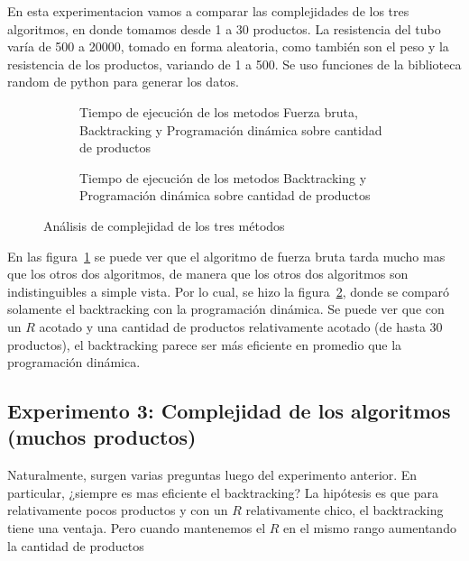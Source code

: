 \documentclass[10pt,a4paper]{article}
\begin{document}
En esta experimentacion vamos a comparar las complejidades de los tres algoritmos, en donde tomamos desde 1 a 30 productos. La resistencia del tubo var\'ia de 500 a 20000, tomado en forma aleatoria, como tambi\'en son el peso y la resistencia de los productos, variando de 1 a 500. Se uso funciones de la biblioteca random de python para generar los datos.

    \begin{figure}[!ht]
        \centering
        \begin{subfigure}{0.45\linewidth}
            \centering
            
            \caption{Tiempo de ejecución de los metodos Fuerza bruta, Backtracking y Programaci\'on din\'amica sobre cantidad de productos}
            \label{fig:comparacion-bt-fb-dp}
        \end{subfigure}
        \begin{subfigure}{0.45\linewidth}
            \centering
            
            \caption{Tiempo de ejecución de los metodos Backtracking y Programaci\'on din\'amica sobre cantidad de productos}
            \label{fig:comparacion-bt-dp}
        \end{subfigure}
    \caption{Análisis de complejidad de los tres m\'etodos}
    \label{fig:bt-fb-dp-complejidad}
    \end{figure}
    
En las figura~\ref{fig:comparacion-bt-fb-dp} se puede ver que el algoritmo de fuerza bruta tarda mucho mas que los otros dos algoritmos, de manera que los otros dos algoritmos son indistinguibles a simple vista. Por lo cual, se hizo la figura~\ref{fig:comparacion-bt-dp}, donde se compar\'o solamente el backtracking con la programaci\'on din\'amica. Se puede ver que con un $R$ acotado y una cantidad de productos relativamente acotado (de hasta 30 productos), el backtracking parece ser m\'as eficiente en promedio que la programaci\'on din\'amica.


\subsection{Experimento 3: Complejidad de los algoritmos (muchos productos)}

Naturalmente, surgen varias preguntas luego del experimento anterior. En particular, ¿siempre es mas eficiente el backtracking? La hip\'otesis es que para relativamente pocos productos y con un $R$ relativamente chico, el backtracking tiene una ventaja. Pero cuando mantenemos el $R$ en el mismo rango aumentando la cantidad de productos
\end{document}
